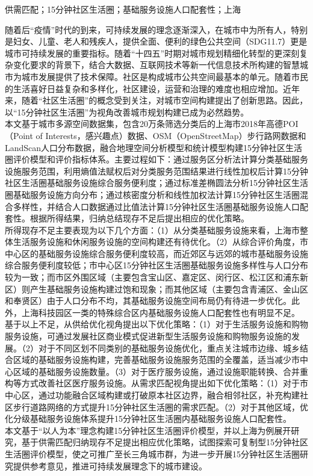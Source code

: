 \documentclass{shnuthesis}
\begin{document}
\begin{cnabstract}{供需匹配；15分钟社区生活圈；基础服务设施人口配套性；上海}

随着后“疫情”时代的到来，可持续发展的理念逐渐深入，在城市中为所有人，特别是妇女、儿童、老人和残疾人，提供全面、便利的绿色公共空间（SDG11.7）更是城市可持续发展的重要指标。随着“十四五”时期对城市规划精细化转型的更深刻复杂变化要求的背景下，结合大数据、互联网技术等新一代信息技术所构建的智慧城市为城市发展提供了技术保障。社区是构成城市公共空间最基本的单元。随着市民的生活喜好日益复杂和多样化，社区建设，运营和治理的难度也相应增加。近年来，随着“社区生活圈”的概念受到关注，对城市空间构建提出了创新思路。因此，以“15分钟社区生活圈”为视角改善城市规划构建已成为必然趋势。\\
\indent 本文基于城市多源空间数据集，包含20万条筛选分类后的上海市2018年高德POI（Point of Interests，感兴趣点）数据、OSM（OpenStreetMap）步行路网数据和LandScan人口分布数据，融合地理空间分析模型和统计模型构建15分钟社区生活圈评价模型和评价指标体系。主要过程如下：通过服务区分析法计算分类基础服务设施服务范围，利用熵值法赋权后对分类服务范围结果进行线性加权后计算15分钟社区生活圈基础服务设施综合服务便利度；通过标准差椭圆法分析15分钟社区生活圈基础服务设施方向分布；通过核密度分析和线性加权法计算15分钟社区生活圈混合多样性，并结合人口数据通过比值法计算15分钟社区生活圈基础服务设施人口配套性。根据所得结果，归纳总结现存不足后提出相应的优化策略。\\
\indent 所得现存不足主要表现为以下几个方面：（1）从分类基础服务设施来看，上海市整体生活服务设施和休闲服务设施的空间构建还有待优化。（2）从综合评价角度，市中心区的基础服务设施综合服务便利度较高，而近郊区与远郊的城市基础服务设施综合服务便利度较低；市中心区15分钟社区生活圈基础服务设施多样性与人口分布较为一致；而市区外围区域（主要包含宝山区、嘉定区、闵行区、松江区和浦东新区）则产生基础服务设施构建过饱和现象；而其他区域（主要包含青浦区、金山区和奉贤区）由于人口分布不均，其基础服务设施空间布局仍有待进一步优化。此外，上海科技园区一类的特殊综合区内基础服务设施人口配套性也有明显不足。\\
\indent 基于以上不足，从供给优化视角提出以下优化策略：（1）对于生活服务设施和购物服务设施，可通过发展社区商业模式促进新型生活服务设施和购物服务设施的发展。（2）对于不同区划不同类别的基础服务设施优化，重点关注城市边缘、城乡结合区域的基础服务设施构建，完善基础服务设施服务范围的全覆盖，适当减少市中心区域的基础服务设施数量。（3）对于医疗服务设施，通过设施职能转换、合并重构等方式改善社区医疗服务设施。从需求匹配视角提出如下优化策略：（1）对于市中心区，通过功能融合区域构建或打破原本社区边界，融合相邻社区，补充构建社区步行道路网络的方式提升15分钟社区生活圈的需求匹配。（2）对于其他区域，优化分级基础服务设施体系提升15分钟社区生活圈内基础服务设施人口配套性。\\
\indent 本文基于“以人为本”理念构建15分钟社区生活圈评价模型，并以上海为例展开研究，基于供需匹配归纳现存不足提出相应优化策略，试图探索可复制型15分钟社区生活圈评价模型，使之可推广至长三角城市群，为进一步开展15分钟社区生活圈研究提供参考意见，推进可持续发展理念下的城市建设。

\end{cnabstract}
\end{document}
